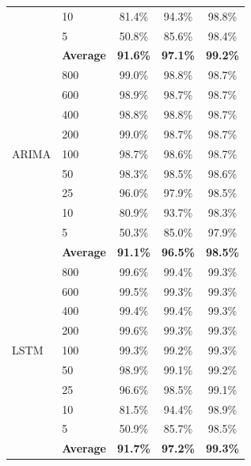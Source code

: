 \documentclass[11pt,a4paper]{article}
\begin{document}
\begin{table}[H]
\begin{tabular}{llccc}
 & 10  & 81.4\% & 94.3\% & 98.8\% \\
 & 5   & 50.8\% & 85.6\% & 98.4\% \\
 & \textbf{Average} & \textbf{91.6\%} & \textbf{97.1\%} & \textbf{99.2\%} \\
\midrule
\multirow{9}{*}{ARIMA}
 & 800 & 99.0\% & 98.8\% & 98.7\% \\
 & 600 & 98.9\% & 98.7\% & 98.7\% \\
 & 400 & 98.8\% & 98.8\% & 98.7\% \\
 & 200 & 99.0\% & 98.7\% & 98.7\% \\
 & 100 & 98.7\% & 98.6\% & 98.7\% \\
 & 50  & 98.3\% & 98.5\% & 98.6\% \\
 & 25  & 96.0\% & 97.9\% & 98.5\% \\
 & 10  & 80.9\% & 93.7\% & 98.3\% \\
 & 5   & 50.3\% & 85.0\% & 97.9\% \\
 & \textbf{Average} & \textbf{91.1\%} & \textbf{96.5\%} & \textbf{98.5\%} \\
\midrule
\multirow{9}{*}{LSTM}
 & 800 & 99.6\% & 99.4\% & 99.3\% \\
 & 600 & 99.5\% & 99.3\% & 99.3\% \\
 & 400 & 99.4\% & 99.4\% & 99.3\% \\
 & 200 & 99.6\% & 99.3\% & 99.3\% \\
 & 100 & 99.3\% & 99.2\% & 99.3\% \\
 & 50  & 98.9\% & 99.1\% & 99.2\% \\
 & 25  & 96.6\% & 98.5\% & 99.1\% \\
 & 10  & 81.5\% & 94.4\% & 98.9\% \\
 & 5   & 50.9\% & 85.7\% & 98.5\% \\
 & \textbf{Average} & \textbf{91.7\%} & \textbf{97.2\%} & \textbf{99.3\%} \\
\bottomrule
\end{tabular}
\end{table}
\end{document}
